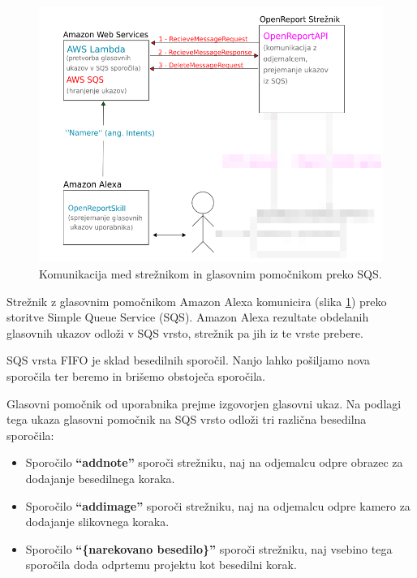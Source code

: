 \documentclass[a4paper, 12pt]{book}
\begin{document}
\begin{figure}[H]
\begin{center}
\includegraphics[width=13cm]{plan_sqs_server_alexa}
\end{center}
\caption{Komunikacija med strežnikom in glasovnim pomočnikom preko SQS.}
\label{plan_sqs_server_alexa}
\end{figure}


Strežnik z glasovnim pomočnikom Amazon Alexa komunicira (slika \ref{plan_sqs_server_alexa}) preko storitve Simple Queue Service (SQS). %
Amazon Alexa rezultate obdelanih glasovnih ukazov odloži v SQS vrsto, strežnik pa jih iz te vrste prebere.

SQS vrsta FIFO je sklad besedilnih sporočil.
Nanjo lahko pošiljamo nova sporočila ter beremo in brišemo obstoječa sporočila.

Glasovni pomočnik od uporabnika prejme izgovorjen glasovni ukaz.
Na podlagi tega ukaza glasovni pomočnik na SQS vrsto odloži tri različna besedilna sporočila:
\begin{itemize}
	\item Sporočilo \textbf{\enquote{addnote}} sporoči strežniku, naj na odjemalcu odpre obrazec za dodajanje besedilnega koraka.
	\item Sporočilo  \textbf{\enquote{addimage}} sporoči strežniku, naj na odjemalcu odpre kamero za dodajanje slikovnega koraka.
	\item Sporočilo \textbf{\enquote{\{narekovano besedilo\}}} sporoči strežniku, naj vsebino tega sporočila doda odprtemu projektu kot besedilni korak.
\end{itemize}
\end{document}
